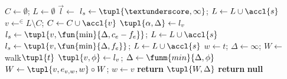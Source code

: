 \begin{algorithmic}
\State $C\gets\emptyset$; $L\gets\emptyset$
\State $\vec{l}\gets$
\State $l_s\gets\tupl{\textunderscore,\infty}$; $L\gets L\cup\accl{s}$
\State $v\gets^{\in}L\setminus C$; $C\gets C\cup\accl{v}$
\State $\tupl{\alpha,\Delta}\gets l_v$
\State $l_s\gets\tupl{v,\fun{\min}{\Delta,c_e-f_e}}$; $L\gets L\cup\accl{s}$
\EndIf
\EndFor
{}
\State $l_s\gets\tupl{v,\fun{\min}{\Delta,f_e}}$; $L\gets L\cup\accl{s}$
\EndIf
\EndFor
\EndWhile
{}
\State $w\gets t$; $\Delta\gets\infty$; $W\gets$ walk$\tupl{t}$
\State $\tupl{v,\phi}\gets l_v$; $\Delta\gets\funm{min}{\Delta,\phi}$
\State $W\gets\tupl{v,e_{v,w},w}\circ W$; $w\gets v$
\EndWhile
\State \textbf{return} $\tupl{W,\Delta}$
\Else
\State \textbf{return} \textbf{null}
\EndIf
\EndFunction
\end{algorithmic}